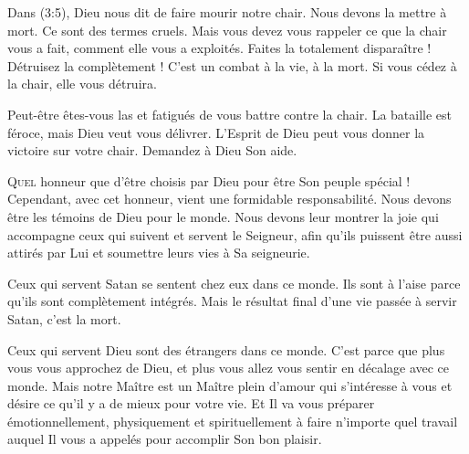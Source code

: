 
Dans (3:5), Dieu nous dit de faire mourir notre chair.
 Nous devons la mettre à mort. Ce sont des termes cruels.
 Mais vous devez vous rappeler ce que la chair vous a fait,
 comment elle vous a exploités. Faites la totalement disparaître !
 Détruisez la complètement ! C'est un combat à la vie, à la mort.
 Si vous cédez à la chair, elle vous détruira.

Peut-être êtes-vous las et fatigués de vous battre contre la chair.
 La bataille est féroce, mais Dieu veut vous délivrer.
 L'Esprit de Dieu peut vous donner la victoire sur votre chair.
 Demandez à Dieu Son aide. 

\dvrule






\lettrine{Q}{uel} honneur que d'être choisis par Dieu
 pour être Son peuple spécial !
 Cependant, avec cet honneur, vient une formidable responsabilité.
 Nous devons être les témoins de Dieu pour le monde.
 Nous devons leur montrer la joie qui accompagne ceux qui suivent
 et servent le Seigneur, afin qu'ils puissent être aussi attirés par Lui
 et soumettre leurs vies à Sa seigneurie. 


Ceux qui servent Satan se sentent chez eux dans ce monde.
 Ils sont à l'aise parce qu'ils sont complètement intégrés.
 Mais le résultat final d'une vie passée à servir Satan, c'est la mort.

Ceux qui servent Dieu sont des étrangers dans ce monde.
 C'est parce que plus vous vous approchez de Dieu,
 et plus vous allez vous sentir en décalage avec ce monde.
 Mais notre Maître est un Maître plein d'amour qui s'intéresse à vous
 et désire ce qu'il y a de mieux pour votre vie.
 Et Il va vous préparer émotionnellement, physiquement et spirituellement
 à faire n'importe quel travail auquel Il vous a appelés
 pour accomplir Son bon plaisir.


